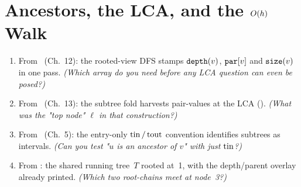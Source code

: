 \section{Ancestors, the LCA, and the $O(h)$ Walk}\label{sec:c11-idea}

\begin{previouslybox}
\begin{enumerate}[nosep, leftmargin=1.8em]
  \item From ~(Ch.~12): the rooted-view DFS 
        stamps \(\texttt{depth}(v)\), \(\texttt{par}[v]\) and \(\texttt{size}(v)\)
        in one pass. \emph{(Which array do you need before any LCA question
        can even be posed?)}
  \item From ~(Ch.~13): the subtree fold harvests pair-values at
        the LCA (). \emph{(What was the "top node"
        $\ell$ in that construction?)}
  \item From ~(Ch.~5): the entry-only \(\operatorname{tin}/\operatorname{tout}\) convention
        identifies subtrees as intervals. \emph{(Can you test
        "\(u\) is an ancestor of \(v\)" with just \(\operatorname{tin}\)?)}
  \item From : the shared running tree~\(T\) rooted at~1,
        with the depth/parent overlay already printed. \emph{(Which two
        root-chains meet at node~3?)}
\end{enumerate}
\end{previouslybox}

